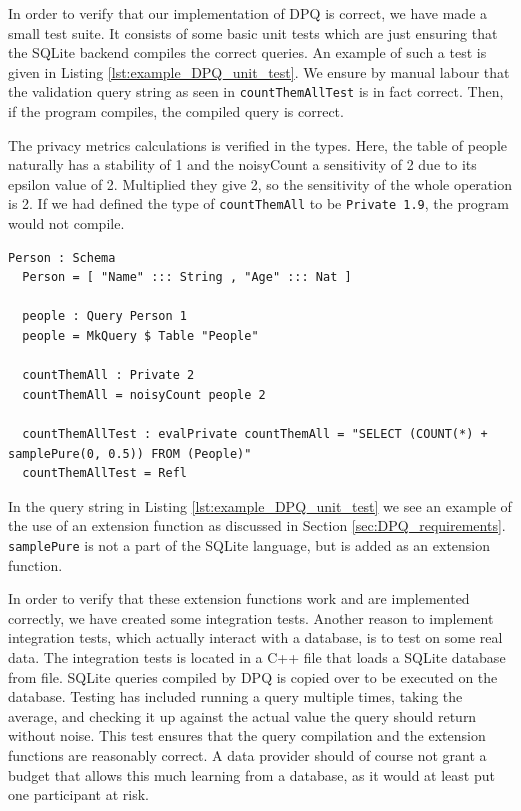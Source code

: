 \documentclass[12pt]{report}
\begin{document}
In order to verify that our implementation of DPQ is correct, we have made a small test suite.
It consists of some basic unit tests which are just ensuring that the SQLite backend compiles the correct queries.
An example of such a test is given in Listing \ref{lst:example_DPQ_unit_test}.
We ensure by manual labour that the validation query string as seen in \texttt{countThemAllTest} is in fact correct.
Then, if the program compiles, the compiled query is correct.

The privacy metrics calculations is verified in the types.
Here, the table of people naturally has a stability of 1 and the noisyCount a sensitivity of 2 due to its epsilon value of 2.
Multiplied they give 2, so the sensitivity of the whole operation is 2.
If we had defined the type of \texttt{countThemAll} to be \texttt{Private 1.9}, the program would not compile.

\begin{lstlisting}[caption={Unit test for noisyCount},label={lst:example_DPQ_unit_test}]
  Person : Schema
  Person = [ "Name" ::: String , "Age" ::: Nat ]

  people : Query Person 1
  people = MkQuery $ Table "People"

  countThemAll : Private 2
  countThemAll = noisyCount people 2

  countThemAllTest : evalPrivate countThemAll = "SELECT (COUNT(*) + samplePure(0, 0.5)) FROM (People)"
  countThemAllTest = Refl

\end{lstlisting}

In the query string in Listing \ref{lst:example_DPQ_unit_test} we see an example of the use of an extension function as discussed in Section \ref{sec:DPQ_requirements}.
\texttt{samplePure} is not a part of the SQLite language, but is added as an extension function.

In order to verify that these extension functions work and are implemented correctly, we have created some integration tests.
Another reason to implement integration tests, which actually interact with a database, is to test on some real data.
The integration tests is located in a C++ file that loads a SQLite database from file.
SQLite queries compiled by DPQ is copied over to be executed on the database.
Testing has included running a query multiple times, taking the average, and checking it up against the actual value the query should return without noise.
This test ensures that the query compilation and the extension functions are reasonably correct.
A data provider should of course not grant a budget that allows this much learning from a database, as it would at least put one participant at risk.
\end{document}
